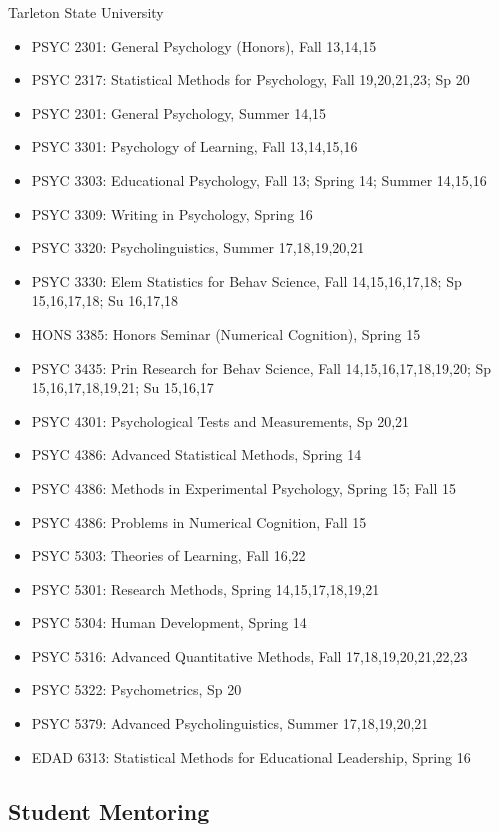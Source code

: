 \documentclass[article,10pt]{article}
\begin{document}
Tarleton State University

\begin{itemize}
\item PSYC 2301: General Psychology (Honors), Fall 13,14,15
\item PSYC 2317: Statistical Methods for Psychology, Fall 19,20,21,23; Sp 20
\item PSYC 2301: General Psychology, Summer 14,15
\item PSYC 3301: Psychology of Learning, Fall 13,14,15,16
\item PSYC 3303: Educational Psychology, Fall 13; Spring 14; Summer 14,15,16
\item PSYC 3309: Writing in Psychology, Spring 16
\item PSYC 3320: Psycholinguistics, Summer 17,18,19,20,21
\item PSYC 3330: Elem Statistics for Behav Science, Fall 14,15,16,17,18; Sp 15,16,17,18; Su 16,17,18
\item HONS 3385: Honors Seminar (Numerical Cognition), Spring 15
\item PSYC 3435: Prin Research for Behav Science, Fall 14,15,16,17,18,19,20; Sp 15,16,17,18,19,21; Su 15,16,17
\item PSYC 4301: Psychological Tests and Measurements, Sp 20,21
\item PSYC 4386: Advanced Statistical Methods, Spring 14
\item PSYC 4386: Methods in Experimental Psychology, Spring 15; Fall 15
\item PSYC 4386: Problems in Numerical Cognition, Fall 15
\item PSYC 5303: Theories of Learning, Fall 16,22
\item PSYC 5301: Research Methods, Spring 14,15,17,18,19,21
\item PSYC 5304: Human Development, Spring 14
\item PSYC 5316: Advanced Quantitative Methods, Fall 17,18,19,20,21,22,23
\item PSYC 5322: Psychometrics, Sp 20
\item PSYC 5379: Advanced Psycholinguistics, Summer 17,18,19,20,21
\item EDAD 6313: Statistical Methods for Educational Leadership, Spring 16
\end{itemize}
\subsection*{Student Mentoring}
\label{sec:org3b8fc45}
\end{document}
